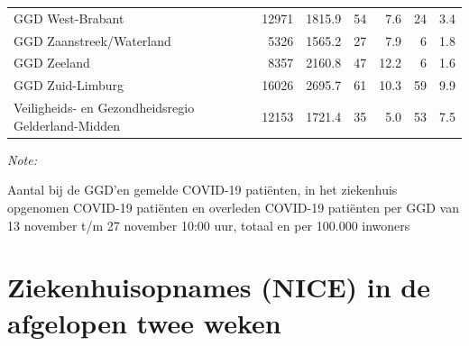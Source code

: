 \documentclass[
  english,
  man,floatsintext]{apa6}
\begin{document}
\begin{table}
\begin{threeparttable}
\begin{tabular}{lrrrrrr}
GGD West-Brabant & 12971 & 1815.9 & 54 & 7.6 & 24 & 3.4\\
GGD Zaanstreek/Waterland & 5326 & 1565.2 & 27 & 7.9 & 6 & 1.8\\
GGD Zeeland & 8357 & 2160.8 & 47 & 12.2 & 6 & 1.6\\
GGD Zuid-Limburg & 16026 & 2695.7 & 61 & 10.3 & 59 & 9.9\\
Veiligheids- en Gezondheidsregio Gelderland-Midden & 12153 & 1721.4 & 35 & 5.0 & 53 & 7.5\\
\bottomrule
\end{tabular}
\begin{tablenotes}
\item \textit{Note: } 
\item Aantal bij de GGD’en gemelde COVID-19 patiënten, in het ziekenhuis opgenomen COVID-19 patiënten en overleden COVID-19 patiënten per GGD van 13 november t/m 27 november 10:00 uur, totaal en per 100.000 inwoners
\end{tablenotes}
\end{threeparttable}
\endgroup{}
\end{table}

\newpage

\hypertarget{ziekenhuisopnames-nice-in-de-afgelopen-twee-weken}{%
\section{Ziekenhuisopnames (NICE) in de afgelopen twee weken}\label{ziekenhuisopnames-nice-in-de-afgelopen-twee-weken}}
\end{document}
